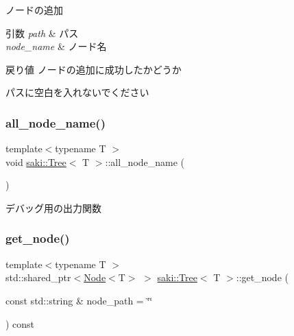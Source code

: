 ノードの追加 


\begin{DoxyParams}{引数}
{\em path} & パス \\
\hline
{\em node\+\_\+name} & ノード名 \\
\hline
\end{DoxyParams}
\begin{DoxyReturn}{戻り値}
ノードの追加に成功したかどうか
\end{DoxyReturn}
パスに空白を入れないでください \mbox{\label{classsaki_1_1_tree_a1a2c7a0f165de86065bddd676cca6f15}} 
\subsubsection{\texorpdfstring{all\+\_\+node\+\_\+name()}{all\_node\_name()}}
{\footnotesize\ttfamily template$<$typename T $>$ \\
void \mbox{\hyperlink{classsaki_1_1_tree}{saki\+::\+Tree}}$<$ T $>$\+::all\+\_\+node\+\_\+name (\begin{DoxyParamCaption}{ }\end{DoxyParamCaption})\hspace{0.3cm}{\ttfamily [inline]}}



デバッグ用の出力関数 

\mbox{\label{classsaki_1_1_tree_aad47033095b8e210bd2e265f7160e176}} 
\subsubsection{\texorpdfstring{get\+\_\+node()}{get\_node()}}
{\footnotesize\ttfamily template$<$typename T $>$ \\
std\+::shared\+\_\+ptr$<$\mbox{\hyperlink{classsaki_1_1_node}{Node}}$<$T$>$ $>$ \mbox{\hyperlink{classsaki_1_1_tree}{saki\+::\+Tree}}$<$ T $>$\+::get\+\_\+node (\begin{DoxyParamCaption}\item[{const std\+::string \&}]{node\+\_\+path = {\ttfamily \char`\"{}\char`\"{}} }\end{DoxyParamCaption}) const\hspace{0.3cm}{\ttfamily [inline]}}



